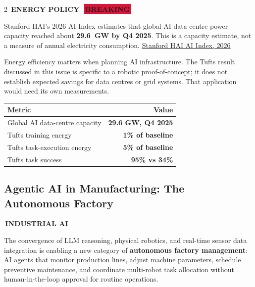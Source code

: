 \documentclass[10pt, a4paper]{article}
\newcommand{\sectiontag}[1]{%
  \noindent\colorbox{cobalt}{%
    \,\footnotesize\bfseries\color{white}\MakeUppercase{#1}\,}\,%
}
\newcommand{\hottag}{%
  \colorbox{crimson}{\,\scriptsize\bfseries\color{white}BREAKING\,}\ %
}
\begin{document}
\begin{multicols}{2}
\sectiontag{Energy Policy}\quad\hottag

\medskip
{\small
Stanford HAI's 2026 AI Index estimates that global AI data-centre power capacity reached about \textbf{29.6~GW by Q4 2025}. This is a capacity estimate, not a measure of annual electricity consumption.
\href{https://hai.stanford.edu/assets/files/ai_index_report_2026_chapter_1_research_development.pdf}{Stanford HAI AI Index, 2026}

Energy efficiency matters when planning AI infrastructure. The Tufts result discussed in this issue is specific to a robotic proof-of-concept; it does not establish expected savings for data centres or grid systems. That application would need its own measurements.
}

\begin{statbox}[title={\faBolt\quad AI Energy Demand --- Global Context}]
  \begin{center}
  \begin{tabular}{l r}
    \toprule
    \small\textbf{Metric} & \small\textbf{Value} \\
    \midrule
    \small Global AI data-centre capacity & \small \textbf{29.6 GW, Q4 2025} \\
    \small Tufts training energy          & \small \textbf{1\% of baseline} \\
    \small Tufts task-execution energy    & \small \textbf{5\% of baseline} \\
    \small Tufts task success             & \small \textbf{95\% vs 34\%} \\
    \bottomrule
  \end{tabular}
  \end{center}
\end{statbox}


\subsection{Agentic AI in Manufacturing: The Autonomous Factory}

\sectiontag{Industrial AI}

\medskip
{\small
The convergence of LLM reasoning, physical robotics, and real-time sensor data integration is enabling a new category of \textbf{autonomous factory management}: AI agents that monitor production lines, adjust machine parameters, schedule preventive maintenance, and coordinate multi-robot task allocation without human-in-the-loop approval for routine operations.

}
\end{multicols}
\end{document}
